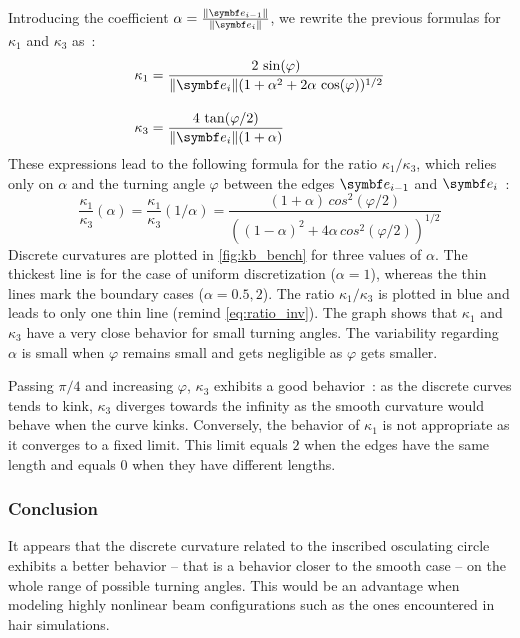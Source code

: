 Introducing the coefficient $\alpha = \frac{\norm{\vect{e}_{i-1}}}{\norm{\vect{e}_{i}}}$, we rewrite the previous formulas for $\kappa_1$ and $\kappa_3$ as~:
\begin{equation}
\begin{aligned}
	\kappa_1 &= \frac{2 \,\sin(\varphi)}{\norm{\vect{e}_{i}}(1+ \alpha^2 + 2 \alpha \, \cos(\varphi))^{1/2}} \\[10pt]
	\kappa_3 &= \frac{4 \,\tan(\varphi/2)}{\norm{\vect{e}_{i}}(1+\alpha)}
\end{aligned}
\end{equation}
These expressions lead to the following formula for the ratio $\kappa_1 / \kappa_3$, which relies only on $\alpha$ and the turning angle $\varphi$ between the edges $\vect{e}_{i-1}$ and $\vect{e}_{i}$~:
\begin{equation}
	\frac{\kappa_1}{\kappa_3}(\alpha) = \frac{\kappa_1}{\kappa_3}(1/\alpha)= \frac{(1+\alpha)\,cos^2(\varphi/2)}{((1- \alpha)^2 + 4 \alpha \, cos^2(\varphi/2))^{1/2}}
	\label{eq:ratio_inv}
\end{equation}
Discrete curvatures are plotted in \cref{fig:kb_bench} for three values of $\alpha$. The thickest line is for the case of uniform discretization ($\alpha=1$), whereas the thin lines mark the boundary cases ($\alpha=0.5,2$). The ratio $\kappa_1/\kappa_3$ is plotted in blue and leads to only one thin line (remind \cref{eq:ratio_inv}). The graph shows that $\kappa_1$ and $\kappa_3$ have a very close behavior for small turning angles. The variability regarding $\alpha$ is small when $\varphi$ remains small and gets negligible as $\varphi$ gets smaller.

Passing $\pi/4$ and increasing $\varphi$, $\kappa_3$ exhibits a good behavior~: as the discrete curves tends to kink, $\kappa_3$ diverges towards the infinity as the smooth curvature would behave when the curve kinks. Conversely, the behavior of $\kappa_1$ is not appropriate as it converges to a fixed limit. This limit equals $2$ when the edges have the same length and equals $0$ when they have different lengths.

\subsubsection{Conclusion}
It appears that the discrete curvature related to the inscribed osculating circle exhibits a better behavior -- that is a behavior closer to the smooth case -- on the whole range of possible turning angles. This would be an advantage when modeling highly nonlinear beam configurations such as the ones encountered in hair simulations. 

